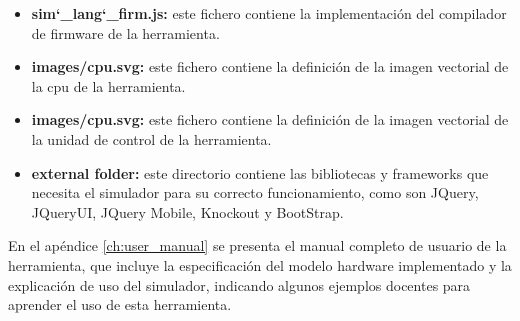 \begin{itemize}
\item \textbf{sim\char`_lang\char`_firm.js: } este fichero contiene la implementación del compilador de firmware de la herramienta.

\item \textbf{images/cpu.svg: } este fichero contiene la definición de la imagen vectorial de la cpu de la herramienta.

\item \textbf{images/cpu.svg: } este fichero contiene la definición de la imagen vectorial de la unidad de control de la herramienta.

\item \textbf{external folder: } este directorio contiene las bibliotecas y frameworks que necesita el simulador para su correcto funcionamiento, como son JQuery, JQueryUI, JQuery Mobile, Knockout y BootStrap.

\end{itemize}

En el apéndice \ref{ch:user_manual} se presenta el manual completo de usuario de la herramienta, que incluye la especificación del modelo hardware implementado y la explicación de uso del simulador, indicando algunos ejemplos docentes para aprender el uso de esta herramienta.

\afterpage{\blankpage} %
